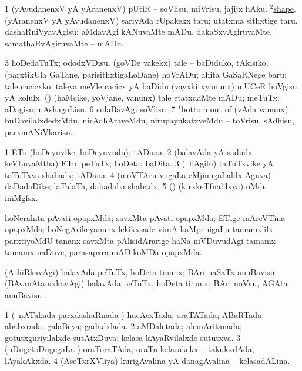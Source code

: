 \noindent
\gl{\nuga}
\bmng
\bnum
\num{1}  (yAvudanenxV yA yAranenxV) pUtiR -- soVlisu, miVrisu, jajijx hAku. 
  \hyperref{kandict_s.pdf}{S}{shape(2) pagu(2)}{$^2$shape}. (yAranenxV yA yAvudanenxV) 
\banum
{} sariyAda rUpakekx taru; utatxma sithxtige taru. 
 dashaRniVyavAgisu; aMdavAgi kANuvaMte mADu. 
 dakaSxvAgiruvaMte, samathaRvAgiruvaMte -- mADu. 
\eanum
\numie
\num{3}  hoDedaTuTx; ododxVDisu. 
  
\banum
{} (goVDe \mo vakekx) tale -- baDiduko, tAkisiko. 
 (parxtikUla GaTane, parisithxtigaLoDane) hoVrADu; ahita GaSaRNege baru; tale cacicxko. 
\eanum
\numie
{}  
\banum
{} taleya meVle cacicx yA baDidu (vayxkitxyanunx) mUCeR hoVgisu yA kolulx. 
 (\rUpa) (haMcike, yoVjane, \mo vanunx) tale etatxdaMte mADu; meTuTx; aDagisu; nAshagoLisu. 
\eanum
\numie
\num{6}  sulaBavAgi soVlisu. 
\num{7}  \hyperref{kandict_b.pdf}{B}{bottom(1) nuga(7)}{$^1$bottom out of} (vAda \mo vanunx) buDavilalxdedxMdu, nirAdhAraveMdu, nirupayukatxveMdu -- toVrisu, sAdhisu, parxmANiVkarisu. 
\enum
\emng
\eentry

\bentry
{}
\gl{\nA}
\bmng
\bnum
\num{1} ETu (hoDeyuvike, hoDeyuvudu); tADana. 
\num{2} (balavAda yA sadudx keVLuvaMtha) ETu; peTuTx; hoDeta; baDita. 
\num{3} (\kanmu\ bAgilu) taTuTxvike yA taTuTxva shabadx; tADana. 
\num{4} (moVTAru \mo vugaLa eMjinugaLalilx Aguva) daDadaDike; laTalaTa, dabadaba shabadx. 
\num{5} (\AmA) (kirxkeTfnalilxya) oMdu iniMgfsx. 
\enum
\emng

\noindent
\gl{\pagu}
\bmng
{} hoNerahita pAvati opapxMda; savxMta pAvati opapxMda; ETige mAreVTina opapxMda; hoNegArikeyanunx lekikxsade vimA kaMpenigaLu tamamxlilx parxtiyoMdU tananx savxMta pAlisidArarige haNa niVDuvudAgi tamamx tamamx naDuve, parasapxra mADikoMDa opapxMda. 
\emng

\noindent
\gl{\nuga}
\bmng
{}  
\banum
{} (AthiRkavAgi) balavAda peTuTx, hoDeta tinunx; BAri naSaTx anuBavisu. 
 (BAvanAtamxkavAgi) balavAda peTuTx, hoDeta tinunx; BAri noVvu, AGAta anuBavisu. 
\eanum
\emng
\eentry

\bentry
{}
\gl{\gu}
\bmng
\bnum
\num{1} (\sA\ nATakada parxdashaRnada \vi) hucAcxTada; oraTATada; ABaRTada; ababxrada; galaBeya; gadadxlada. 
\num{2} aMDaletada; alemAritanada; gotutxguriyilalxde sutAtxDuva; kelasa kAyaRvilalxde sututxva. 
\num{3} (uDugetoDugegaLa \vi) oraToraTAda; oraTu kelasakekx -- takukxdAda, lAyakAkxda. 
\num{4} (AseTxrXVliya) kurigAvalina yA danagAvalina -- kelasadALina. 
\enum
\emng
\eentry

